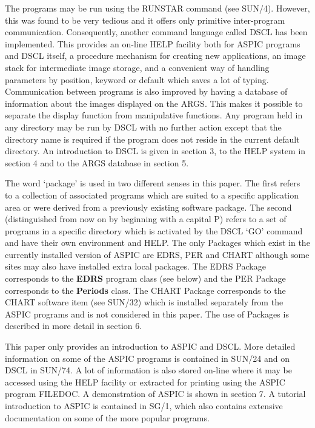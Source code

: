 The programs may be run using the RUNSTAR command (see SUN/4).
However, this was found to be very tedious and it offers only primitive
inter-program communication.
Consequently, another command language called DSCL has been implemented.
This provides an on-line HELP facility both for ASPIC programs and DSCL itself,
a procedure mechanism for creating new applications, an image stack for
intermediate image storage, and a convenient way of handling parameters by
position, keyword or default which saves a lot of typing.
Communication between programs is also improved by having a database of
information about the images displayed on the ARGS.
This makes it possible to separate the display function from manipulative
functions.
Any program held in any directory may be run by DSCL with no further action
except that the directory name is required if the program does not reside in
the current default directory.
An introduction to DSCL is given in section 3, to the HELP system in section 4
and to the ARGS database in section 5.

The word `package' is used in two different senses in this paper.
The first refers to a collection of associated programs which are suited to
a specific application area or were derived from a previously existing software
package.
The second (distinguished from now on by beginning with a capital P) refers to
a set of programs in a specific directory which is activated by the
DSCL `GO' command and have their own environment and HELP.
The only Packages which exist in the currently installed version of ASPIC are
EDRS, PER and CHART although some sites may also have installed extra local
packages.
The EDRS Package corresponds to the {\bf EDRS} program class (see below) and
the PER Package corresponds to the {\bf Periods} class.
The CHART Package corresponds to the CHART software item (see SUN/32) which
is installed separately from the ASPIC programs and is not considered in this
paper.
The use of Packages is described in more detail in section 6.

This paper only provides an introduction to ASPIC and DSCL.
More detailed information on some of the ASPIC programs is contained in SUN/24
and on DSCL in SUN/74.
A lot of information is also stored on-line where it may be accessed using the
HELP facility or extracted for printing using the ASPIC program FILEDOC.
A demonstration of ASPIC is shown in section 7.
A tutorial introduction to ASPIC is contained in SG/1, which also contains
extensive documentation on some of the more popular programs.

